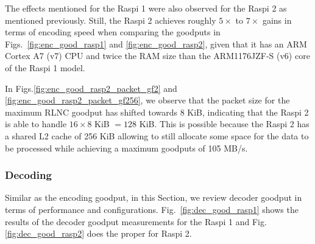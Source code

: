 %
\par
The effects mentioned for the \ac{Raspi} 1 were also observed for
the \ac{Raspi} 2 as mentioned previously. Still, the \ac{Raspi} 2 achieves
roughly $5\times$ to $7\times$ gains in terms of encoding speed when comparing
the goodputs in Figs.~\ref{fig:enc_good_rasp1} and \ref{fig:enc_good_rasp2},
given that it has an \ac{ARM} Cortex A7 (v7) \ac{CPU} and twice the \ac{RAM}
size than the \ac{ARM}1176JZF-S (v6) core of the \ac{Raspi} 1 model.

In Figs.\ref{fig:enc_good_rasp2_packet_gf2} and
\ref{fig:enc_good_rasp2_packet_gf256}, we observe that the packet size for
the maximum \ac{RLNC} goodput has shifted towards 8 KiB, indicating that
the \ac{Raspi} 2 is able to handle $16 \times 8$ KiB $= 128$ KiB. This is
possible because the \ac{Raspi} 2 has a shared L2 cache of 256 KiB allowing
to still allocate some space for the data to be processed while achieving
a maximum goodputs of 105 MB/s.

\subsubsection{Decoding}
Similar as the encoding goodput, in this Section, we review decoder
goodput in terms of performance and configurations.
Fig.~\ref{fig:dec_good_rasp1} shows the results of the decoder goodput
measurements for the \ac{Raspi} 1 and Fig. \ref{fig:dec_good_rasp2} does
the proper for \ac{Raspi} 2.

